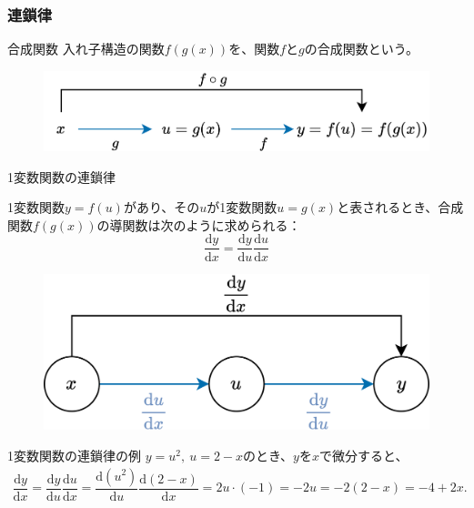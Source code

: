 \documentclass[dvipdfmx,aspectratio=169]{beamer}
\begin{document}
	\subsubsection{連鎖律}
	\begin{frame}{合成関数}
		入れ子構造の関数$ f(g(x)) $を、関数$ f $と$ g $の\alert{合成関数}という。
		\begin{figure}
			\centering
			\includegraphics[width=0.7\linewidth]{img/composite-function}
		\end{figure}
	\end{frame}
	\begin{frame}{1変数関数の連鎖律}
		\begin{screen}
			1変数関数$ y = f(u) $があり、その$ u $が1変数関数$ u = g(x) $と表されるとき、合成関数$ f(g(x)) $の導関数は次のように求められる：
			\begin{equation*}
				\dfrac{\mathrm{d}y}{\mathrm{d}x} = \dfrac{\mathrm{d}y}{\mathrm{d}u} \dfrac{\mathrm{d}u}{\mathrm{d}x}
			\end{equation*}
		\end{screen}
		\begin{figure}
			\centering
			\includegraphics[width=0.65\linewidth]{img/chain-rule-at-1-variable}
		\end{figure}
	\end{frame}
	\begin{frame}{1変数関数の連鎖律の例}
		$ y = u^2,\ u = 2-x $のとき、$ y $を$ x $で微分すると、
		\begin{align*}
			\dfrac{\mathrm{d}y}{\mathrm{d}x} = \dfrac{\mathrm{d}y}{\mathrm{d}u} \dfrac{\mathrm{d}u}{\mathrm{d}x} = \dfrac{\mathrm{d}(u^2)}{\mathrm{d}u} \dfrac{\mathrm{d}(2-x)}{\mathrm{d}x} = 2u \cdot (-1) = -2u = -2(2-x) = -4+2x.
		\end{align*}
	\end{frame}
\end{document}
